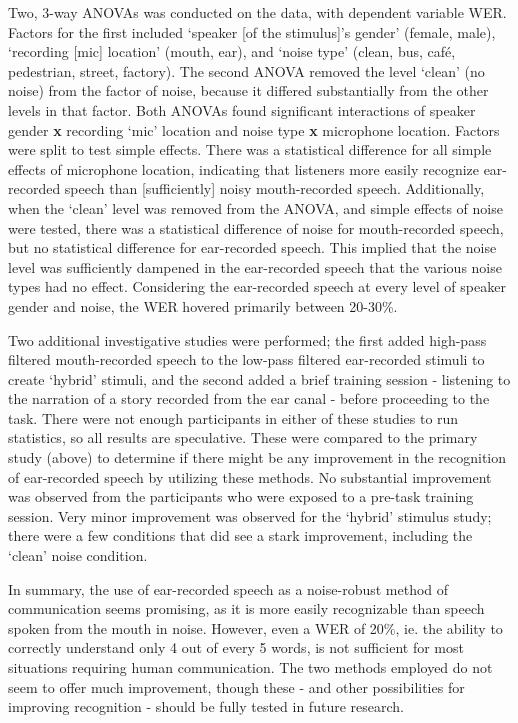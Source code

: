 Two, 3-way ANOVAs was conducted on the data, with dependent variable WER.  Factors for the first included `speaker [of the stimulus]'s gender' (female, male), `recording [mic] location' (mouth, ear), and `noise type' (clean, bus, caf\'{e}, pedestrian, street, factory).  The second ANOVA removed the level `clean' (no noise) from the factor of noise, because it differed substantially from the other levels in that factor.  Both ANOVAs found significant interactions of speaker gender \textbf{x} recording `mic' location and noise type \textbf{x} microphone location.  Factors were split to test simple effects.  There was a statistical difference for all simple effects of microphone location, indicating that listeners more easily recognize ear-recorded speech than [sufficiently] noisy mouth-recorded speech.  Additionally, when the `clean' level was removed from the ANOVA, and simple effects of noise were tested, there was a statistical difference of noise for mouth-recorded speech, but no statistical difference for ear-recorded speech.  This implied that the noise level was sufficiently dampened in the ear-recorded speech that the various noise types had no effect.  Considering the ear-recorded speech at every level of speaker gender and noise, the WER hovered primarily between 20-30\%.

Two additional investigative studies were performed; the first added high-pass filtered mouth-recorded speech to the low-pass filtered ear-recorded stimuli to create `hybrid' stimuli, and the second added a brief training session - listening to the narration of a story recorded from the ear canal - before proceeding to the task.  There were not enough participants in either of these studies to run statistics, so all results are speculative.  These were compared to the primary study (above) to determine if there might be any improvement in the recognition of ear-recorded speech by utilizing these methods.  No substantial improvement was observed from the participants who were exposed to a pre-task training session.  Very minor improvement was observed for the `hybrid' stimulus study; there were a few conditions that did see a stark improvement, including the `clean' noise condition.

In summary, the use of ear-recorded speech as a noise-robust method of communication seems promising, as it is more easily recognizable than speech spoken from the mouth in noise.  However, even a WER of 20\%, ie. the ability to correctly understand only 4 out of every 5 words, is not sufficient for most situations requiring human communication.  The two methods employed do not seem to offer much improvement, though these - and other possibilities for improving recognition - should be fully tested in future research.



